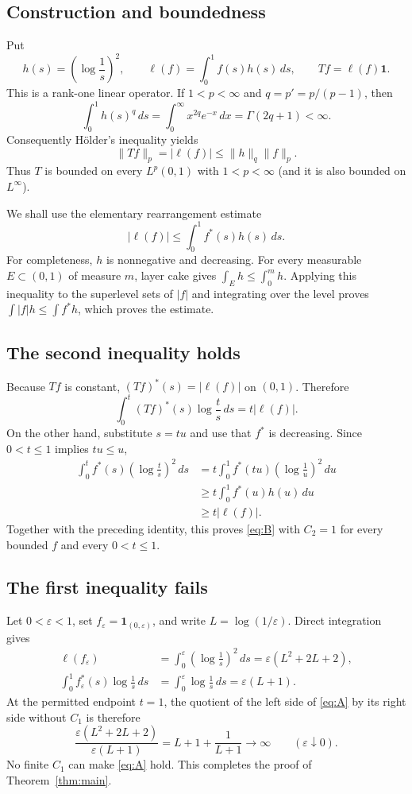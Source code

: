 \documentclass[11pt]{article}
\newcommand{\one}{\mathbf 1}
\begin{document}
\subsection{Construction and boundedness}

Put
\[
 h(s)=\left(\log\frac1s\right)^2,\qquad
 \ell(f)=\int_0^1 f(s)h(s)\,ds,
 \qquad Tf=\ell(f)\one.
\]
This is a rank-one linear operator.  If $1<p<\infty$ and
$q=p'=p/(p-1)$, then
\[
 \int_0^1 h(s)^q\,ds
 =\int_0^\infty x^{2q}e^{-x}\,dx
 =\Gamma(2q+1)<\infty.
\]
Consequently H\"older's inequality yields
\[
 \|Tf\|_p=|\ell(f)|\leq \|h\|_q\|f\|_p.
\]
Thus $T$ is bounded on every $L^p(0,1)$ with $1<p<\infty$ (and it is also
bounded on $L^\infty$).

We shall use the elementary rearrangement estimate
\[
 |\ell(f)|\leq\int_0^1 f^*(s)h(s)\,ds.
\]
For completeness, $h$ is nonnegative and decreasing.  For every measurable
$E\subset(0,1)$ of measure $m$, layer cake gives
$\int_Eh\leq\int_0^m h$.  Applying this inequality to the superlevel sets of
$|f|$ and integrating over the level proves
$\int|f|h\leq\int f^*h$, which proves the estimate.

\subsection{The second inequality holds}

Because $Tf$ is constant, $(Tf)^*(s)=|\ell(f)|$ on $(0,1)$.  Therefore
\[
 \int_0^t (Tf)^*(s)\log\frac ts\,ds
 =t|\ell(f)|.
\]
On the other hand, substitute $s=tu$ and use that $f^*$ is decreasing.  Since
$0<t\leq1$ implies $tu\leq u$,
\begin{align*}
 \int_0^t f^*(s)\left(\log\frac ts\right)^2\,ds
 &=t\int_0^1 f^*(tu)\left(\log\frac1u\right)^2\,du\\
 &\geq t\int_0^1 f^*(u)h(u)\,du\\
 &\geq t|\ell(f)|.
\end{align*}
Together with the preceding identity, this proves \eqref{eq:B} with $C_2=1$ for
every bounded $f$ and every $0<t\leq1$.

\subsection{The first inequality fails}

Let $0<\varepsilon<1$, set
$f_\varepsilon=\one_{(0,\varepsilon)}$, and write
$L=\log(1/\varepsilon)$.  Direct integration gives
\begin{align*}
 \ell(f_\varepsilon)
 &=\int_0^\varepsilon\left(\log\frac1s\right)^2\,ds
 =\varepsilon(L^2+2L+2),\\
 \int_0^1 f_\varepsilon^*(s)\log\frac1s\,ds
 &=\int_0^\varepsilon\log\frac1s\,ds
 =\varepsilon(L+1).
\end{align*}
At the permitted endpoint $t=1$, the quotient of the left side of
\eqref{eq:A} by its right side without $C_1$ is therefore
\[
 \frac{\varepsilon(L^2+2L+2)}{\varepsilon(L+1)}
 =L+1+\frac1{L+1}\longrightarrow\infty
 \qquad(\varepsilon\downarrow0).
\]
No finite $C_1$ can make \eqref{eq:A} hold.  This completes the proof of
Theorem~\ref{thm:main}.
\end{document}
